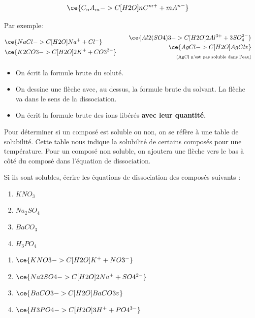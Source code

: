 \documentclass[
  11pt,
  french,
  a4paper,
  openany]{book}
\providecommand{\tightlist}{%
  \setlength{\itemsep}{0pt}\setlength{\parskip}{0pt}}
\begin{document}
\[ \ce{C_{n}A_{m} ->C[H2O] n C^{m+} + m A^{n-}} \]

Par exemple:
\[ \begin{split}
  & \ce{NaCl ->C[H2O] Na^{+} + Cl^{-} } \\
  & \ce{K2CO3 ->C[H2O] 2 K^{+} + CO3^{2-} }
  \end{split}
  \qquad
  \begin{split}
  \ce{Al2(SO4)3 ->C[H2O] 2 Al^{3+} + 3 SO_{4}^{2-} } \\
  \ce{AgCl ->C[H2O] AgCl v } \\
  {\scriptsize \text{(AgCl n'est pas soluble dans l'eau)}}
  \end{split} \]

\begin{itemize}
\tightlist
\item
  On écrit la formule brute du soluté.
\item
  On dessine une flèche avec, au dessus, la formule brute du solvant. La flèche va dans le sens de la dissociation.
\item
  On écrit la formule brute des ions libérés \textbf{avec leur quantité}.
\end{itemize}

Pour déterminer si un composé est soluble ou non, on se réfère à une table de solubilité. Cette table nous indique la solubilité de certains composés pour une température. Pour un composé non soluble, on ajoutera une flèche vers le bas à côté du composé dans l'équation de dissociation.

\begin{Exercise}

Si ils sont solubles, écrire les équations de dissociation des composés suivants :

\begin{enumerate}
\def\labelenumi{\arabic{enumi}.}
\item
  \(KNO_3\)
\item
  \(Na_2SO_4\)
\item
  \(BaCO_3\)
\item
  \(H_3PO_4\)
\end{enumerate}


\end{Exercise}

\begin{Answer}

\begin{enumerate}
\def\labelenumi{\arabic{enumi}.}
\item
  \(\ce{KNO3 ->C[H2O] K^{+} + NO3^{-} }\)
\item
  \(\ce{Na2SO4 ->C[H2O] 2 Na^{+} + SO4^{2-} }\)
\item
  \(\ce{BaCO3 ->C[H2O] BaCO3 v }\)
\item
  \(\ce{H3PO4 ->C[H2O] 3 H^{+} + PO4^{3-} }\)
\end{enumerate}


\end{Answer}
\end{document}
